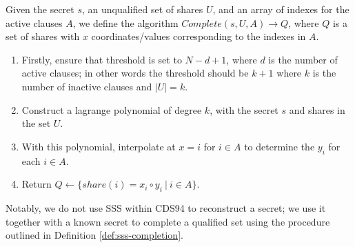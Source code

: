 \begin{definition}\label{def:sss-completion}
Given the secret $s$, an unqualified set of shares $U$, and an array of indexes for the active clauses $A$, we define the algorithm $Complete(s, U, A) \rightarrow Q$, where $Q$ is a set of shares with $x$ coordinates/values corresponding to the indexes in $A$. 

\begin{enumerate}
    \item Firstly, ensure that threshold is set to $N - d + 1$, where $d$ is the number of active clauses; in other words the threshold should be $k + 1$ where $k$ is the number of inactive clauses and $|U| = k$. 
    \item Construct a lagrange polynomial of degree $k$, with the secret $s$ and shares in the set $U$. 
    \item With this polynomial, interpolate at $x = i$ for $i \in A$ to determine the $y_i$ for each $i \in A$.
    \item Return $Q \leftarrow \{share(i) =  x_i\circ y_i\ |\ i \in A\}$.
\end{enumerate}
    
\end{definition}

Notably, we do not use SSS within CDS94 to reconstruct a secret; we use it together with a known secret to complete a qualified set using the procedure outlined in Definition \ref{def:sss-completion}.
